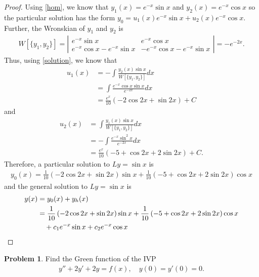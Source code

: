 \documentclass[12pt]{article}
\theoremstyle{definition}
\newtheorem{problem}{Problem}
\begin{document}
\begin{proof}
  Using \eqref{hom}, we know that $y_1(x) = e^{-x}\sin x$ and $y_2(x) = e^{-x}\cos x$
  so the particular solution has the form $y_0 = u_1(x)e^{-x}\sin x + u_2(x)e^{-x}\cos x$.
  Further, the Wronskian of $y_1$ and $y_2$ is
  \begin{align*}
    W[\{y_1, y_2\}] =
    \left|
      \begin{array}{ll}
        e^{-x}\sin x & e^{-x}\cos x \\
        e^{-x}\cos x - e^{-x}\sin x & -e^{-x}\cos x - e^{-x}\sin x
      \end{array}
    \right|
    = -e^{-2x}.
  \end{align*}
  Thus, using \eqref{solution}, we know that
  \begin{align*}
    u_1(x) &= -\int \frac{y_2(x)\sin x }{W[\{y_1, y_2\}]} dx \\
    &= \int \frac{e^{-x}\cos x\sin x }{e^{-2x}} dx \\
    &= \frac{e^{x}}{10}\left(-2\cos 2x + \sin 2x\right) + C
  \end{align*}
  and
  \begin{align*}
    u_2(x) &= \int \frac{y_1(x)\sin x }{W[\{y_1, y_2\}]} dx \\
    &= -\int \frac{e^{-x}\sin^2 x }{e^{-2x}} dx \\
    &= \frac{e^{x}}{10}\left(-5 +\cos 2x + 2\sin 2x\right)  + C.
  \end{align*}
  Therefore, a particular solution to $Ly=\sin x$ is
  \begin{align*}
    y_0(x) =
    \frac{1}{10}\left(-2\cos 2x + \sin 2x\right)\sin x +
    \frac{1}{10}\left(-5 +\cos 2x + 2\sin 2x\right)\cos x
  \end{align*}
  and the general solution to $Ly = \sin x$ is
  \begin{align}
    y(x) &= y_0(x) + y_h(x) \notag \\
    &= \frac{1}{10}\left(-2\cos 2x + \sin 2x\right)\sin x +
    \frac{1}{10}\left(-5 +\cos 2x + 2\sin 2x\right)\cos x \notag \\
    &\quad +c_1e^{-x}\sin x + c_2 e^{-x}\cos x
  \end{align}
\end{proof}
\newpage


\begin{problem}
  Find the Green function of the IVP
  \begin{align*}
    y'' + 2y' + 2y = f(x), \quad y(0) = y'(0) = 0.
  \end{align*}
\end{problem}
\end{document}
